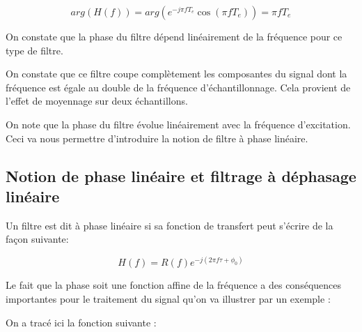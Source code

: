 \documentclass[11pt,a4paper]{article}
\begin{document}
\[ arg(H(f)) = arg(e^{-j\pi f T_e}\cos(\pi f T_e)) = \pi f T_e\]

On constate que la phase du filtre dépend linéairement de la fréquence pour  ce type de filtre.

\begin{center}
\end{center}

On constate que ce filtre coupe complètement les composantes du signal dont la fréquence est égale au double de la fréquence d'échantillonnage. Cela provient de l'effet de moyennage sur deux échantillons.

On note que la phase du filtre évolue linéairement avec la fréquence d'excitation. Ceci va nous permettre d'introduire la notion de filtre à phase linéaire.

\subsection{Notion de phase linéaire et filtrage à déphasage linéaire}
Un filtre est dit à phase linéaire si sa fonction de transfert peut s'écrire de la façon suivante: 

\[ H(f) = R(f)e^{-j(2\pi f \tau +\phi_0)} \]

Le fait que la phase soit une fonction affine de la fréquence a des conséquences importantes pour le traitement du signal qu'on va illustrer par un exemple :

\begin{center}
\end{center}

On a tracé ici la fonction suivante : 
\end{document}

